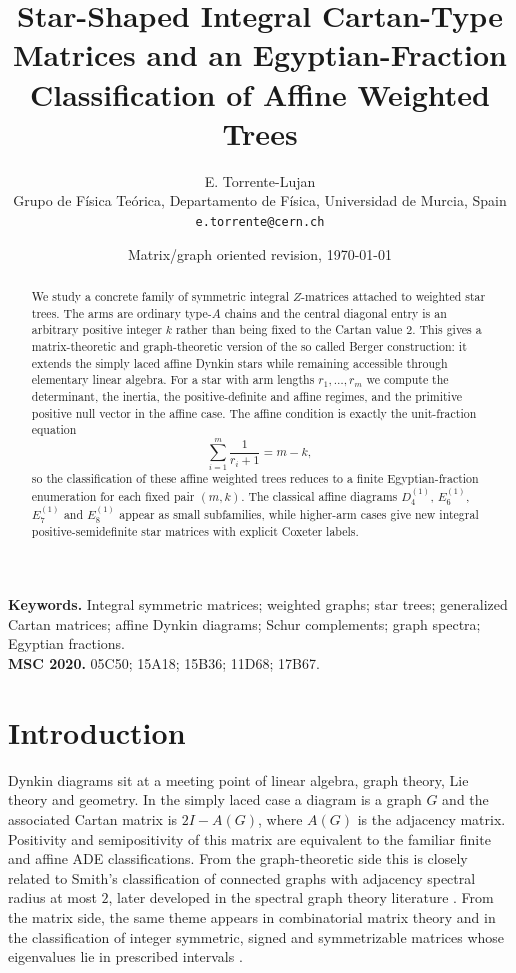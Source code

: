 \documentclass[11pt,a4paper]{article}
\title{Star-Shaped Integral Cartan-Type Matrices and an Egyptian-Fraction Classification of Affine Weighted Trees}
\author{E. Torrente-Lujan\\
\small Grupo de F\'isica Te\'orica, Departamento de F\'isica, Universidad de Murcia, Spain\\
\small \texttt{e.torrente@cern.ch}}
\date{Matrix/graph oriented revision, \today}
\theoremstyle{definition}
\theoremstyle{plain}
\begin{document}
\maketitle

\begin{abstract}
We study a concrete family of symmetric integral $Z$-matrices attached to weighted star trees.  The arms are ordinary type-$A$ chains and the central diagonal entry is an arbitrary positive integer $k$ rather than being fixed to the Cartan value $2$.  This gives a matrix-theoretic and graph-theoretic version of the so called Berger construction: it extends the simply laced affine Dynkin stars while remaining accessible through elementary linear algebra.  For a star with arm lengths $r_1,\ldots,r_m$ we compute the determinant, the inertia, the positive-definite and affine regimes, and the primitive positive null vector in the affine case.  The affine condition is exactly the unit-fraction equation
\[
   \sum_{i=1}^m \frac{1}{r_i+1}=m-k,
\]
so the classification of these affine weighted trees reduces to a finite Egyptian-fraction enumeration for each fixed pair $(m,k)$.  The classical affine diagrams $D_4^{(1)}$, $E_6^{(1)}$, $E_7^{(1)}$ and $E_8^{(1)}$ appear as small subfamilies, while higher-arm cases give new integral positive-semidefinite star matrices with explicit Coxeter labels.  
\end{abstract}

\noindent\textbf{Keywords.} Integral symmetric matrices; weighted graphs; star trees; generalized Cartan matrices; affine Dynkin diagrams; Schur complements; graph spectra; Egyptian fractions.\\
\textbf{MSC 2020.} 05C50; 15A18; 15B36; 11D68; 17B67.


\section{Introduction}

Dynkin diagrams sit at a meeting point of linear algebra, graph theory, Lie theory and geometry.  In the simply laced case a diagram is a graph $G$ and the associated Cartan matrix is $2I-A(G)$, where $A(G)$ is the adjacency matrix.  Positivity and semipositivity of this matrix are equivalent to the familiar finite and affine ADE classifications.  From the graph-theoretic side this is closely related to Smith's classification of connected graphs with adjacency spectral radius at most $2$, later developed in the spectral graph theory literature \citep{Smith1970,Hoffman1972,HoffmanSmith1975,Cvetkovic1980,BrouwerHaemers2012,GodsilRoyle2001}.  From the matrix side, the same theme appears in combinatorial matrix theory and in the classification of integer symmetric, signed and symmetrizable matrices whose eigenvalues lie in prescribed intervals \citep{Bapat2010,BrualdiCvetkovic2008,McKeeSmyth2007,McKeeSmyth2020}.
\end{document}
